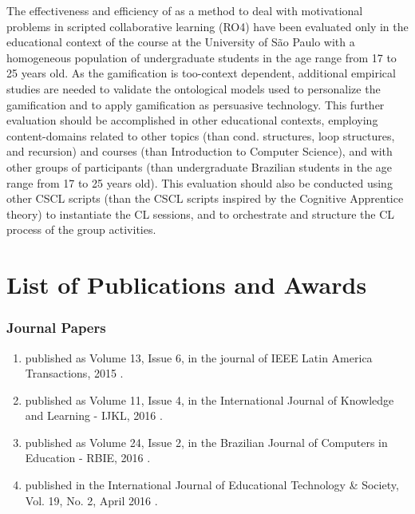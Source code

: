 The effectiveness and efficiency of  as a method to deal with motivational problems in scripted collaborative learning (RO4) have been evaluated only in the educational context of the course  at the University of São Paulo with a homogeneous population of undergraduate students in the age range from 17 to 25 years old.
As the gamification is too-context dependent, additional empirical studies are needed to validate the ontological models used to personalize the gamification and to apply gamification as persuasive technology.
This further evaluation should be accomplished in other educational contexts, employing content-domains related to other topics (than cond. structures, loop structures, and recursion) and courses (than Introduction to Computer Science), and with other groups of participants (than undergraduate Brazilian students in the age range from 17 to 25 years old).
This evaluation should also be conducted using other CSCL scripts (than the CSCL scripts inspired by the Cognitive Apprentice theory) to instantiate the CL sessions, and to orchestrate and structure the CL process of the group activities.

\section{List of Publications and Awards}

\subsubsection*{Journal Papers}

\begin{enumerate}
\item
{} published as Volume 13, Issue 6, in the journal of IEEE Latin America Transactions, 2015 \cite{ChallcoMoreiraBittencourtMizoguchiIsotani2015}.

\item
{} published as Volume 11, Issue 4, in the International Journal of Knowledge and Learning - IJKL, 2016
\cite{ChallcoBittencourtIsotani2016}.


\item
{} published as Volume 24, Issue 2, in the Brazilian Journal of Computers in Education - RBIE, 2016 \cite{ChallcoMizoguchiIsotani2016}.

\item
{} published in the International Journal of Educational Technology \& Society, Vol. 19, No. 2, April 2016 \cite{ChallcoAndradeBorgesBittencourtIsotani2016}.
\end{enumerate}

